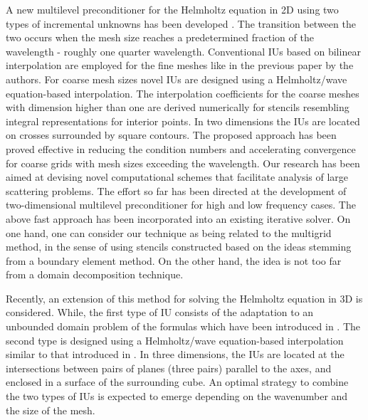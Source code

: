 \documentclass{report}
\begin{document}
A new multilevel preconditioner for the Helmholtz equation in 2D
using two types of incremental unknowns has been developed \cite{PB08}.
The transition between the two occurs when the mesh size reaches a
predetermined fraction of the wavelength - roughly one quarter
wavelength. Conventional IUs based on bilinear interpolation are employed
for the fine meshes like in the previous paper \cite{PB07} by the
authors. For coarse mesh sizes novel IUs are designed using a
Helmholtz/wave equation-based interpolation. The interpolation
coefficients for the coarse meshes with dimension higher than one are
derived numerically for stencils resembling integral representations for
interior points. In two dimensions the IUs are located on crosses
surrounded by square contours. The proposed approach has been proved
effective in reducing the condition numbers and accelerating
convergence for coarse grids with mesh sizes exceeding the wavelength.
Our research has been aimed at devising novel computational schemes that
facilitate analysis of large scattering problems. The effort so far has
been directed at the development of two-dimensional multilevel
preconditioner for high and low frequency cases. The above fast approach
has been incorporated into an existing iterative solver. On one hand, one
can consider our technique as being related to the multigrid method, in
the sense of using stencils constructed based on the ideas stemming from
a boundary element method. On the other hand, the idea is not too far
from a domain decomposition technique.

Recently, an extension of this method for solving the Helmholtz equation
in 3D is considered. While, the first type of IU consists of the
adaptation to an unbounded domain problem of the formulas which have been
introduced in \cite{MCT95}. The second type is designed using a
Helmholtz/wave equation-based interpolation similar to that introduced in
\cite{PB08}.
In three dimensions, the IUs are located at the intersections between
pairs of planes (three pairs) parallel to the axes, and enclosed in a
surface of the surrounding cube.
An optimal strategy to combine the two types of IUs is expected to emerge
depending on the wavenumber and the size of the mesh.
\end{document}
